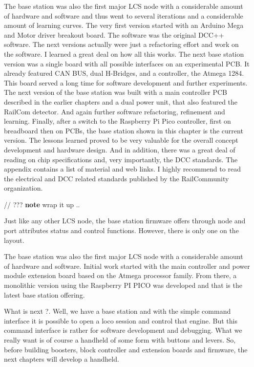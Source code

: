 The base station was also the first major LCS node with a considerable amount of hardware and software and thus went to several iterations and a considerable amount of learning curves. The very first version started with an Arduino Mega and Motor driver breakout board. The software was the original DCC++ software. The next versions actually were just a refactoring effort and work on the software. I learned a great deal on how all this works. The next base station version was a single board with all possible interfaces on an experimental PCB. It already featured CAN BUS, dual H-Bridges, and a controller, the Atmega 1284. This board served a long time for software development and further experiments. The next version of the base station was built with a main controller PCB described in the earlier chapters and a dual power unit, that also featured the RailCom detector. And again further software refactoring, refinement and learning. Finally, after a switch to the Raspberry Pi Pico controller, first on breadboard  then on PCBs, the base station shown in this chapter is the current version. The lessons learned proved to be very valuable for the overall concept development and hardware design. And in addition, there was a great deal of reading on chip specifications and, very importantly, the DCC standards. The appendix contains a list of material and web links. I highly recommend to read the electrical and DCC related standards published by the RailCommunity organization.


// ??? \textbf{note} wrap it up ..

Just like any other LCS node, the base station firmware offers through node and port attributes status and control functions. However, there is only one on the layout.

The base station was also the first major LCS node with a considerable amount of hardware and software. Initial work started with the main controller and power module extension board based on the Atmega processor family. From there, a monolithic version using the Raspberry PI PICO was developed and that is the latest base station offering.

What is next ?. Well, we have a base station and with the simple command interface it is possible to open a loco session and control that engine. But this command interface is rather for software development and debugging. What we really want is of course a handheld of some form with buttons and levers. So, before building boosters, block controller and extension boards and firmware, the next chapters will develop a handheld. 











